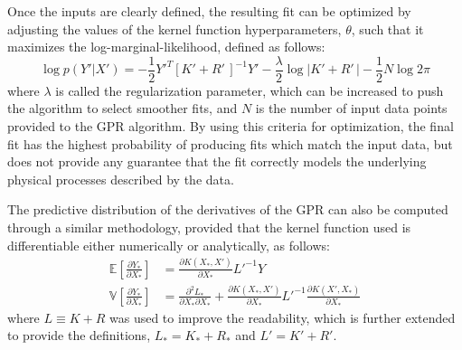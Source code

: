 \documentclass{article}
\begin{document}
Once the inputs are clearly defined, the resulting fit can be optimized by adjusting the values of the kernel function hyperparameters, $\theta$, such that it maximizes the log-marginal-likelihood, defined as follows:
\begin{equation}
\label{eq:LogMarginalLikelihoodSummary}
	\log{p\!\left(Y'|X'\right)} = -\frac{1}{2} Y'^T \left[K' + R'\,\right]^{-1} Y' - \frac{\lambda}{2} \log{\left|K' + R'\,\right|} - \frac{1}{2} N \log{2\pi}
\end{equation}
where $\lambda$ is called the regularization parameter, which can be increased to push the algorithm to select smoother fits, and $N$ is the number of input data points provided to the GPR algorithm. By using this criteria for optimization, the final fit has the highest probability of producing fits which match the input data, but does not provide any guarantee that the fit correctly models the underlying physical processes described by the data.

The predictive distribution of the derivatives of the GPR can also be computed through a similar methodology, provided that the kernel function used is differentiable either numerically or analytically, as follows:
\begin{equation}
\label{eq:GPRHeteroscedasticDerivativePredictionSummary}
	\begin{aligned}
	\mathbb{E}\!\left[\frac{\partial Y_*}{\partial X_*}\right] &= \frac{\partial K\!\left(X_*,X'\right)}{\partial X_*} L'^{-1} Y \\
	\mathbb{V}\!\left[\frac{\partial Y_*}{\partial X_*}\right] &= \frac{\partial^2 L_*}{\partial X_* \partial X_*} + \frac{\partial K\!\left(X_*,X'\right)}{\partial X_*} L'^{-1} \frac{\partial K\!\left(X',X_*\right)}{\partial X_*}
	\end{aligned}
\end{equation}
where $L \equiv K + R$ was used to improve the readability, which is further extended to provide the definitions, $L_* = K_* + R_*$ and $L' = K' + R'$.

\printbibliography
\end{document}
